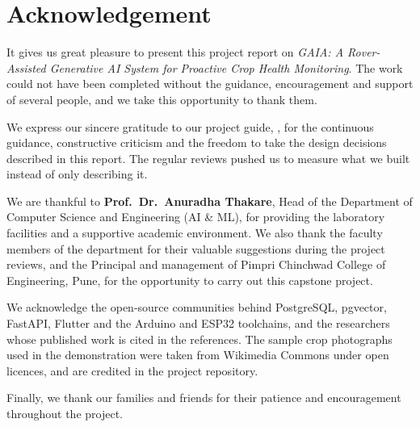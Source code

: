 \chapter*{Acknowledgement}

It gives us great pleasure to present this project report on \emph{GAIA: A Rover-Assisted Generative AI System for
Proactive Crop Health Monitoring}. The work could not have been completed without the guidance, encouragement and
support of several people, and we take this opportunity to thank them.

We express our sincere gratitude to our project guide, , for the continuous
guidance, constructive criticism and the freedom to take the design decisions described in this report. The
regular reviews pushed us to measure what we built instead of only describing it.

We are thankful to \textbf{Prof.\ Dr.\ Anuradha Thakare}, Head of the Department of Computer Science and
Engineering (AI \& ML), for providing the laboratory facilities and a supportive academic environment.
We also thank the faculty members of the department for their valuable suggestions during the project reviews,
and the Principal and management of Pimpri Chinchwad College of Engineering, Pune, for the opportunity to
carry out this capstone project.

We acknowledge the open-source communities behind PostgreSQL, pgvector, FastAPI, Flutter and the Arduino and
ESP32 toolchains, and the researchers whose published work is cited in the references. The sample crop
photographs used in the demonstration were taken from Wikimedia Commons under open licences, and are credited
in the project repository.

Finally, we thank our families and friends for their patience and encouragement throughout the project.

\vspace{24pt}
\begin{flushright}
\begin{singlespace}
\setlength{\parskip}{0pt}
\\
\\
\\
\end{singlespace}
\end{flushright}
\clearpage

